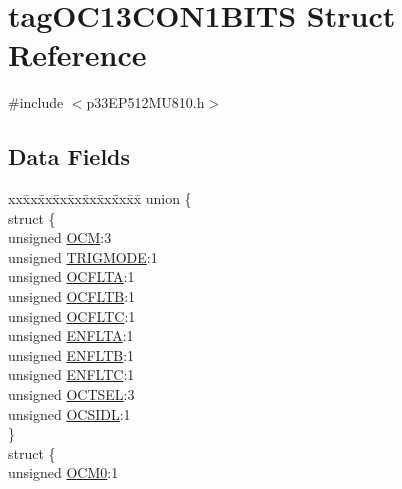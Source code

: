 \hypertarget{structtag_o_c13_c_o_n1_b_i_t_s}{}\section{tag\+O\+C13\+C\+O\+N1\+B\+I\+TS Struct Reference}
\label{structtag_o_c13_c_o_n1_b_i_t_s}


{\ttfamily \#include $<$p33\+E\+P512\+M\+U810.\+h$>$}

\subsection*{Data Fields}
\begin{DoxyCompactItemize}
\item 
\begin{tabbing}
xx\=xx\=xx\=xx\=xx\=xx\=xx\=xx\=xx\=\kill
union \{\\
\>struct \{\\
\>\>unsigned \hyperlink{structtag_o_c13_c_o_n1_b_i_t_s_a778fa0cf51a9477ac4e82d71a8733801}{OCM}:3\\
\>\>unsigned \hyperlink{structtag_o_c13_c_o_n1_b_i_t_s_a7a0057e0dca6e2663584b5b9e1da04c3}{TRIGMODE}:1\\
\>\>unsigned \hyperlink{structtag_o_c13_c_o_n1_b_i_t_s_acc967e41cecdeedc6ad4422f9ef1a6a3}{OCFLTA}:1\\
\>\>unsigned \hyperlink{structtag_o_c13_c_o_n1_b_i_t_s_a1fb30bb4421ef7c4bd0c66c379875593}{OCFLTB}:1\\
\>\>unsigned \hyperlink{structtag_o_c13_c_o_n1_b_i_t_s_a69a1772a4144abd579d17d28445b9934}{OCFLTC}:1\\
\>\>unsigned \hyperlink{structtag_o_c13_c_o_n1_b_i_t_s_a1e0f05fb23d516e003e4713fe8c1498a}{ENFLTA}:1\\
\>\>unsigned \hyperlink{structtag_o_c13_c_o_n1_b_i_t_s_a9d7aa97d5328b8b81ab7fd9145dfa0fc}{ENFLTB}:1\\
\>\>unsigned \hyperlink{structtag_o_c13_c_o_n1_b_i_t_s_a0b6f25c0f83f33b5501b6a2e6141a6ef}{ENFLTC}:1\\
\>\>unsigned \hyperlink{structtag_o_c13_c_o_n1_b_i_t_s_ae37d2a41dae2d2af1d82f7caae33cadb}{OCTSEL}:3\\
\>\>unsigned \hyperlink{structtag_o_c13_c_o_n1_b_i_t_s_afd05f4f249db4ef69b684e2f3fa6b703}{OCSIDL}:1\\
\>\} \\
\>struct \{\\
\>\>unsigned \hyperlink{structtag_o_c13_c_o_n1_b_i_t_s_a9271e84c9759ff10a7bc1cee3276e8f6}{OCM0}:1\\

\end{tabbing}
\end{DoxyCompactItemize}
